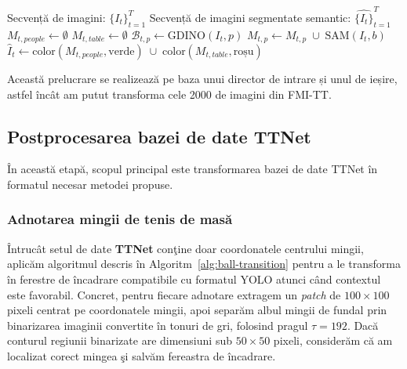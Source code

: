 \begin{algorithm}[H]
\caption{Segmentarea automată a jucătorilor și mesei de tenis.}
\label{alg:gsam}
\begin{algorithmic}[1]
\Require Secvență de imagini: $\{I_t\}_{t=1}^{T}$
\Ensure Secvență de imagini segmentate semantic: $\hat{\{I_t\}}_{t=1}^{T}$
    \State $M_{t,\textit{people}} \gets \emptyset$
    \State $M_{t,\textit{table}}  \gets \emptyset$
      \State $\mathcal{B}_{t,p} \gets \mathrm{GDINO}(I_t, p)$
            \State $M_{t,p} \gets M_{t,p} \;\cup\; \mathrm{SAM}(I_t, b)$ 
        \EndIf
      \EndFor
    \EndFor
    \State $\hat I_t \gets \mathrm{color}(M_{t,\textit{people}},\text{verde})\;\cup\;\mathrm{color}(M_{t,\textit{table}},\text{roșu})$
\EndFor
  
\end{algorithmic}
\end{algorithm}

Această prelucrare se realizează pe baza unui director de intrare și unul de ieșire, astfel încât am putut transforma cele 2000 de imagini din FMI-TT.

\subsection{Postprocesarea bazei de date TTNet}
În această etapă, scopul principal este transformarea bazei de date TTNet în formatul necesar metodei propuse.

\subsubsection{Adnotarea mingii de tenis de masă} 

Întrucât setul de date \textbf{TTNet} conţine doar coordonatele centrului mingii, aplicăm algoritmul descris în Algoritm~\ref{alg:ball-transition} pentru a le transforma în ferestre de încadrare compatibile cu formatul YOLO atunci când contextul este favorabil. Concret, pentru fiecare adnotare extragem un \textit{patch} de \(100\times100\) pixeli centrat pe coordonatele mingii, apoi separăm albul mingii de fundal prin binarizarea imaginii convertite în tonuri de gri, folosind pragul \(\tau = 192\). Dacă conturul regiunii binarizate are dimensiuni sub \(50\times50\) pixeli, considerăm că am localizat corect mingea şi salvăm fereastra de încadrare.

